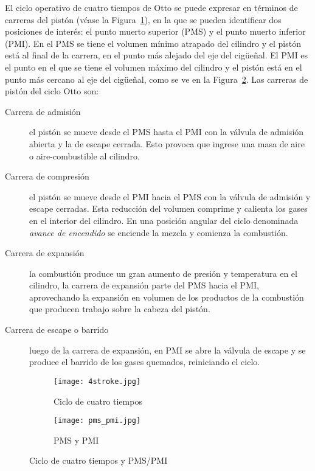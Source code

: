 El ciclo operativo de cuatro tiempos de Otto se puede expresar en términos de
carreras del pistón (véase la Figura~\ref{fig:4tiempos}), en la que se pueden
identificar dos posiciones de interés: el punto muerto superior (PMS) y el punto
muerto inferior (PMI).
%
En el PMS se tiene el volumen mínimo atrapado del cilindro y el pistón está al
final de la carrera, en el punto más alejado del eje del cigüeñal.
%
El PMI es el punto en el que se tiene el volumen máximo del cilindro y el pistón
está en el punto más cercano al eje del cigüeñal, como se ve en la
Figura~\ref{fig:pms_pmi}.
%
Las carreras de pistón del ciclo Otto son:
%
\begin{description}
%
    \item [Carrera de admisión] el pistón se mueve desde el PMS hasta el PMI con
        la válvula de admisión abierta y la de escape cerrada.
        Esto provoca que ingrese una masa de aire o aire-combustible al cilindro.
%
    \item [Carrera de compresión] el pistón se mueve desde el PMI hacia el PMS
        con la válvula de admisión y escape cerradas.
        Esta reducción del volumen comprime y calienta los gases en el interior
del cilindro.
        En una posición angular del ciclo denominada \emph{avance de encendido}
se enciende la mezcla y comienza la combustión.
%
    \item [Carrera de expansión] la combustión produce un gran
aumento de presión y temperatura en el cilindro, la carrera de expansión parte
del PMS hacia el PMI, aprovechando la expansión en volumen de los productos de
la combustión que producen trabajo sobre la cabeza del pistón.
%
    \item [Carrera de escape o barrido] luego de la carrera de expansión, en PMI
se abre la válvula de escape y se produce el  barrido de los gases quemados,
reiniciando el ciclo.
%
\end{description}

\begin{figure}[h!]
  \centering
  \begin{subfigure}{0.6\textwidth}
    \centering
    \texttt{[image: 4stroke.jpg]}
    \caption{Ciclo de cuatro tiempos}\label{fig:4tiempos}
  \end{subfigure}%
  \hfill
  \begin{subfigure}{0.4\textwidth}
    \centering
    \texttt{[image: pms\_pmi.jpg]}
    \caption{PMS y PMI}\label{fig:pms_pmi}
  \end{subfigure}
  \caption{Ciclo de cuatro tiempos y PMS/PMI}
  \label{fig:4tiempos_pms_pmi} %
\end{figure}


